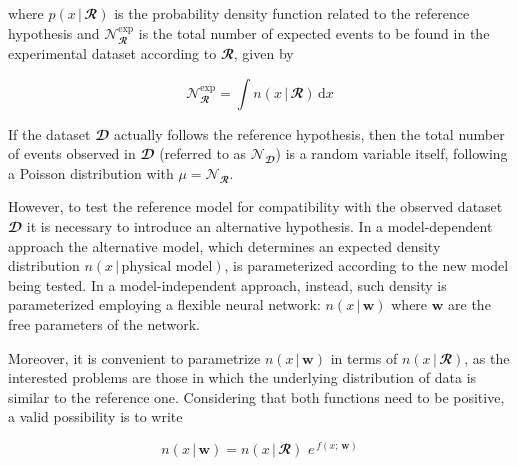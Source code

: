 \noindent where $p(x\,|\,\mathbfcal{R})$ is the probability density function related to the reference hypothesis and
$\mathcal{N}_{\mathbfcal{R}}^{\text{exp}}$ is the total number of expected events to be found in the experimental
dataset according to $\mathbfcal{R}$, given by 

\begin{equation}
    \mathcal{N}_{\mathbfcal{R}}^{\text{exp}}=\int  n(x\,|\,\mathbfcal{R}) \, \text{d}x
\end{equation}


\noindent If the dataset $\mathbfcal{D}$ actually follows the reference hypothesis, then the total number of events
observed in $\mathbfcal{D}$ (referred to as $\mathcal{N}_{\mathbfcal{D}}$) is a random variable itself, following a
Poisson distribution with $\mu=\mathcal{N}_\mathbfcal{R}$. 

However, to test the reference model for compatibility with the observed dataset $\mathbfcal{D}$ it is necessary to
introduce an alternative hypothesis. In a model-dependent approach the alternative model, which determines an expected
density distribution $n(x\,|\,\text{physical model})$, is parameterized according to the new model being tested. In a
model-independent approach, instead, such density is parameterized employing a flexible neural network:
$n(x\,|\,\mathbf{w})$ where $\mathbf{w}$ are the free parameters of the network. 

Moreover, it is convenient to parametrize $n(x\,|\,\mathbf{w})$ in terms of $n(x\,|\,\mathbfcal{R})$, as the interested
problems are those in which the underlying distribution of data is similar to the reference one. Considering that both
functions need to be positive, a valid possibility is to write

\begin{equation}\label{eq:hypspace}
    n(x\,|\,\mathbf{w})=n(x\,|\,\mathbfcal{R})\,\,e^{\,f(x;\,\mathbf{w})}
\end{equation}

